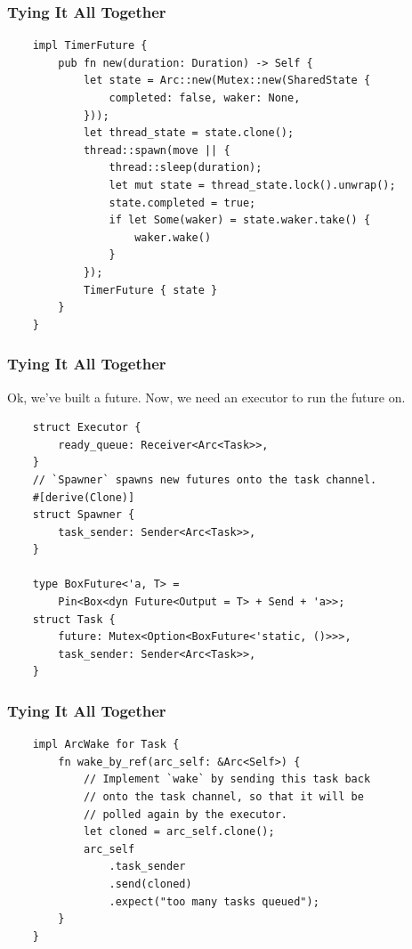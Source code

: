 \documentclass[aspectratio=1610,t]{beamer}
\begin{document}

\begin{frame}[fragile]
\frametitle{Tying It All Together}
\begin{verbatim}
    impl TimerFuture {
        pub fn new(duration: Duration) -> Self {
            let state = Arc::new(Mutex::new(SharedState {
                completed: false, waker: None,
            }));
            let thread_state = state.clone();
            thread::spawn(move || {
                thread::sleep(duration);
                let mut state = thread_state.lock().unwrap();
                state.completed = true;
                if let Some(waker) = state.waker.take() {
                    waker.wake()
                }
            });
            TimerFuture { state }
        }
    }
\end{verbatim}
\end{frame}


\begin{frame}[fragile]
\frametitle{Tying It All Together}
Ok, we've built a future. Now, we need an executor to run the future on.

\begin{verbatim}
    struct Executor {
        ready_queue: Receiver<Arc<Task>>,
    }
    // `Spawner` spawns new futures onto the task channel.
    #[derive(Clone)]
    struct Spawner {
        task_sender: Sender<Arc<Task>>,
    }

    type BoxFuture<'a, T> =
        Pin<Box<dyn Future<Output = T> + Send + 'a>>;
    struct Task {
        future: Mutex<Option<BoxFuture<'static, ()>>>,
        task_sender: Sender<Arc<Task>>,
    }
\end{verbatim}
\end{frame}


\begin{frame}[fragile]
\frametitle{Tying It All Together}
\begin{verbatim}
    impl ArcWake for Task {
        fn wake_by_ref(arc_self: &Arc<Self>) {
            // Implement `wake` by sending this task back
            // onto the task channel, so that it will be
            // polled again by the executor.
            let cloned = arc_self.clone();
            arc_self
                .task_sender
                .send(cloned)
                .expect("too many tasks queued");
        }
    }
\end{verbatim}
\end{frame}
\end{document}

